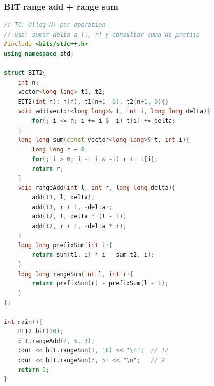\subsubsection{BIT range add + range sum}
\begin{lstlisting}[style=mystyle, language=C++]
// TC: O(log N) per operation
// usa: sumar delta a [l, r] y consultar suma de prefijo
#include <bits/stdc++.h>
using namespace std;

struct BIT2{
	int n;
	vector<long long> t1, t2;
	BIT2(int n): n(n), t1(n+1, 0), t2(n+1, 0){}
	void add(vector<long long>& t, int i, long long delta){
		for(; i <= n; i += i & -i) t[i] += delta;
	}
	long long sum(const vector<long long>& t, int i){
		long long r = 0;
		for(; i > 0; i -= i & -i) r += t[i];
		return r;
	}
	void rangeAdd(int l, int r, long long delta){
		add(t1, l, delta);
		add(t1, r + 1, -delta);
		add(t2, l, delta * (l - 1));
		add(t2, r + 1, -delta * r);
	}
	long long prefixSum(int i){
		return sum(t1, i) * i - sum(t2, i);
	}
	long long rangeSum(int l, int r){
		return prefixSum(r) - prefixSum(l - 1);
	}
};

int main(){
	BIT2 bit(10);
	bit.rangeAdd(2, 5, 3);
	cout << bit.rangeSum(1, 10) << "\n";  // 12
	cout << bit.rangeSum(3, 5) << "\n";   // 9
	return 0;
}
\end{lstlisting}
